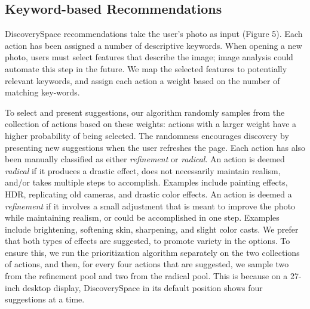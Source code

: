 \subsection{Keyword-based Recommendations}
Discovery\-Space recommendations take the user's photo as input (Figure 5). Each action has been assigned a number of descriptive keywords. When opening a new photo, users must select features that describe the image; image analysis could automate this step in the future. We map the selected features to potentially relevant keywords, and assign each action a weight based on the number of matching key-words.

To select and present suggestions, our algorithm randomly samples from the collection of actions based on these weights: actions with a larger weight have a higher probability of being selected. The randomness encourages discovery by presenting new suggestions when the user refreshes the page. Each action has also been manually classified as either \textit{refinement} or \textit{radical}. An action is deemed \textit{radical} if it produces a drastic effect, does not necessarily maintain realism, and/or takes multiple steps to accomplish. Examples include painting effects, HDR, replicating old cameras, and drastic color effects. An action is deemed a \textit{refinement} if it involves a small adjustment that is meant to improve the photo while maintaining realism, or could be accomplished in one step. Examples include brightening, softening skin, sharpening, and slight color casts. We prefer that both types of effects are suggested, to promote variety in the options. To ensure this, we run the prioritization algorithm separately on the two collections of actions, and then, for every four actions that are suggested, we sample two from the refinement pool and two from the radical pool. This is because on a 27-inch desktop display, Discovery\-Space in its default position shows four suggestions at a time.
